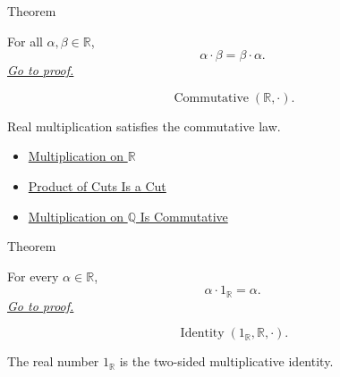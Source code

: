 \begin{theorembox}{Theorem}
\begin{theorem}
\label{thm:multiplication-on-r-commutative}
For all $\alpha,\beta\in\mathbb{R}$,
\[
\alpha\cdot\beta=\beta\cdot\alpha.
\]
\hyperref[prf:multiplication-on-r-commutative]{\textit{Go to proof.}}
\end{theorem}
\end{theorembox}

\begin{remark*}
\[
\operatorname{Commutative}(\mathbb{R},\cdot).
\]
\end{remark*}

\begin{remark*}[Interpretation]
Real multiplication satisfies the commutative law.
\end{remark*}

\begin{dependencies}
\begin{itemize}
  \item \hyperref[def:multiplication-on-r]{Multiplication on $\mathbb{R}$}
  \item \hyperref[lem:product-of-cuts-is-a-cut]{Product of Cuts Is a Cut}
  \item \hyperref[thm:multiplication-on-q-commutative]{Multiplication on $\mathbb{Q}$ Is Commutative}
\end{itemize}
\end{dependencies}

\begin{theorembox}{Theorem}
\begin{theorem}
\label{thm:one-multiplicative-identity-on-r}
For every $\alpha\in\mathbb{R}$,
\[
\alpha\cdot 1_{\mathbb{R}}=\alpha.
\]
\hyperref[prf:one-multiplicative-identity-on-r]{\textit{Go to proof.}}
\end{theorem}
\end{theorembox}

\begin{remark*}
\[
\operatorname{Identity}(1_{\mathbb{R}},\mathbb{R},\cdot).
\]
\end{remark*}

\begin{remark*}[Interpretation]
The real number $1_{\mathbb{R}}$ is the two-sided multiplicative identity.
\end{remark*}

